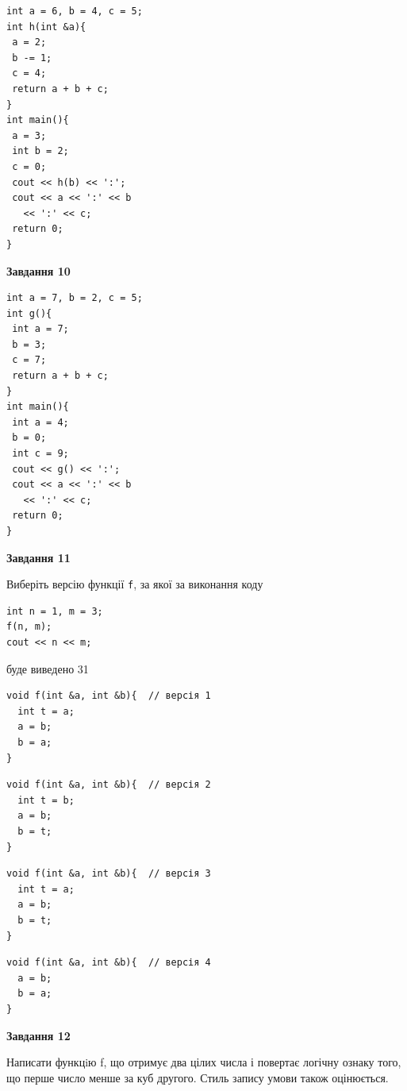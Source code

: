 \documentclass[12pt, ukrainian]{article}
\def\code#1{\Verb!#1!}
\begin{document}
{\begin {large}
\begin{minipage}[t]{7.0cm}
\begin{verbatim}
int a = 6, b = 4, c = 5;
int h(int &a){
 a = 2;
 b -= 1;
 c = 4;
 return a + b + c;
}
int main(){
 a = 3;
 int b = 2;
 c = 0;
 cout << h(b) << ':';
 cout << a << ':' << b 
   << ':' << c;
 return 0;
}
\end{verbatim}



\begin{center}
\textbf{Завдання 10}
\end{center}
\vspace{-8mm}

\begin{verbatim}
int a = 7, b = 2, c = 5;
int g(){
 int a = 7;
 b = 3;
 c = 7;
 return a + b + c;
}
int main(){
 int a = 4;
 b = 0;
 int c = 9;
 cout << g() << ':';
 cout << a << ':' << b 
   << ':' << c;
 return 0;
}
\end{verbatim}

\end{minipage}
\vline \hspace{1mm}
\begin{minipage}[t]{11.0cm}

\begin{center}
\textbf{Завдання 11}
\end{center}
Виберіть версію функції \code{f}, за якої за виконання коду
\begin{verbatim}
int n = 1, m = 3;
f(n, m);
cout << n << m;
\end{verbatim}

буде виведено 31

\begin{verbatim}
void f(int &a, int &b){  // версія 1
  int t = a;
  a = b;
  b = a;
}
\end{verbatim}

\vspace{-8mm}\begin{verbatim}
void f(int &a, int &b){  // версія 2
  int t = b;
  a = b;
  b = t;
}
\end{verbatim}

\vspace{-8mm}\begin{verbatim}
void f(int &a, int &b){  // версія 3
  int t = a;
  a = b;
  b = t;
}
\end{verbatim}

\vspace{-8mm}\begin{verbatim}
void f(int &a, int &b){  // версія 4
  a = b;
  b = a;
}
\end{verbatim}



\begin{center}
\textbf{Завдання 12}
\end{center}

Написати функцiю f, що отримує два цілих числа і повертає логічну ознаку того, що перше число менше за куб другого. Стиль запису умови також оцінюється.\par

\end{minipage}

\end {large}}
\newpage
\end{document}
